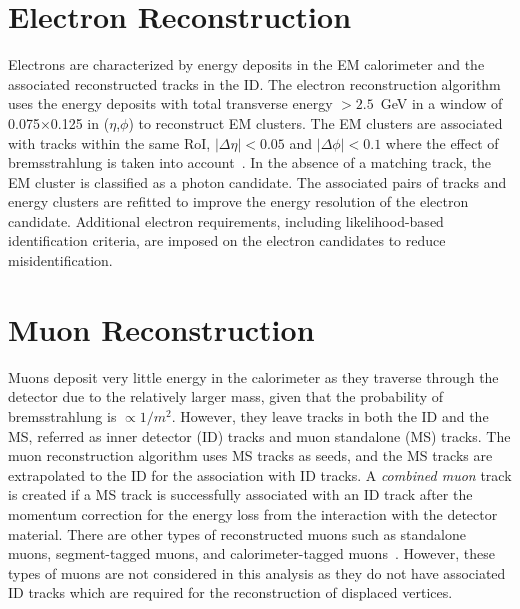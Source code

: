 \section{Electron Reconstruction}
\label{sec:reco:lep}

Electrons are characterized by energy deposits in the EM calorimeter and the associated reconstructed tracks in the ID. The electron reconstruction algorithm uses the energy deposits with total transverse energy $>2.5$~\si{\GeV} in a window of 0.075$\times$0.125 in ($\eta$,$\phi$) to reconstruct EM clusters. The EM clusters are associated with tracks within the same RoI, $|\Delta\eta|<0.05$ and $|\Delta\phi|<0.1$ where the effect of bremsstrahlung is taken into account~\cite{Aad:2014fxa}. In the absence of a matching track, the EM cluster is classified as a photon candidate. The associated pairs of tracks and energy clusters are refitted to improve the energy resolution of the electron candidate. Additional electron requirements, including likelihood-based identification criteria, are imposed on the electron candidates to reduce misidentification.


\section{Muon Reconstruction}
\label{sec:reco:muon}

Muons deposit very little energy in the calorimeter as they traverse through the detector due to the relatively larger mass, given that the probability of bremsstrahlung is $\propto 1/m^{2}$. However, they leave tracks in both the ID and the MS, referred as inner detector (ID) tracks and muon standalone (MS) tracks. The muon reconstruction algorithm uses MS tracks as seeds, and the MS tracks are extrapolated to the ID for the association with ID tracks. A \textit{combined muon} track is created if a MS track is successfully associated with an ID track after the momentum correction for the energy loss from the interaction with the detector material. There are other types of reconstructed muons such as standalone muons, segment-tagged muons, and calorimeter-tagged muons~\cite{Aad:2016jkr}. However, these types of muons are not considered in this analysis as they do not have associated ID tracks which are required for the reconstruction of displaced vertices.

